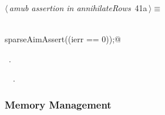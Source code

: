\documentclass{article}
\begin{document}
\begin{flushleft} \small
\begin{minipage}{\linewidth}\label{scrap52}\raggedright\small
{} $\langle\,${\itshape amub assertion in annihilateRows}\nobreak\ {\footnotesize {41a}}$\,\rangle\equiv$
\vspace{-1ex}
\begin{list}{}{} \item
\mbox{}\verb@@\\
\mbox{}\verb@      sparseAimAssert((ierr == 0));@\\
\mbox{}\verb@@{\NWsep}
\end{list}
\vspace{-1.5ex}
\footnotesize
\begin{list}{}{\setlength{\itemsep}{-\parsep}\setlength{\itemindent}{-\leftmargin}}
\item \NWtxtMacroRefIn\ .
\item \NWtxtIdentsUsed\nobreak\  \verb@ierr@\nobreak\ .
\item{}
\end{list}
\end{minipage}\vspace{4ex}
\end{flushleft}
\subsubsection{Memory Management}
\end{document}
